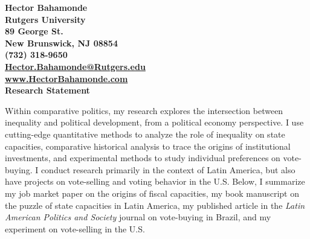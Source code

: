 \documentclass[11pt]{letter} %
\date{}
\begin{document}

\begin{letter}{} 


\begin{center}
\large\bf Hector Bahamonde \\ %
Rutgers University\\
89 George St. \\ New Brunswick, NJ 08854 \\ (732) 318-9650 \\ 
\href{mailto:hector.bahamonde@rutgers.edu}{Hector.Bahamonde@Rutgers.edu} \\
\href{http://www.hectorbahamonde.com}{www.HectorBahamonde.com}\\

{\huge\vspace{8mm} Research Statement}
\end{center} 


\opening{} 
 
Within comparative politics, my research explores the intersection between inequality and political development, from a political economy perspective. I use cutting-edge quantitative methods to analyze the role of inequality on state capacities, comparative historical analysis to trace the origins of institutional investments, and experimental methods to study individual preferences on vote-buying. I conduct research primarily in the context of Latin America, but also have projects on vote-selling and voting behavior in the U.S. Below, I summarize my job market paper on the origins of fiscal capacities, my book manuscript on the puzzle of state capacities in Latin America, my published article in the \emph{Latin American Politics and Society} journal on vote-buying in Brazil, and my experiment on vote-selling in the U.S.


\end{letter}
\end{document}
